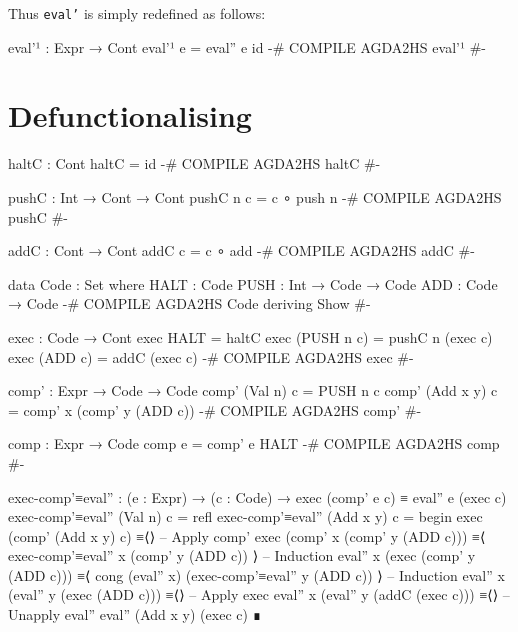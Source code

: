 \documentclass{article}
\begin{document}
\noindent
Thus \texttt{eval'} is simply redefined as follows:

\begin{code}
eval'¹ : Expr → Cont
eval'¹ e = eval'' e id
{-# COMPILE AGDA2HS eval'¹ #-}
\end{code}

\section{Defunctionalising}

\begin{code}
haltC : Cont
haltC = id
{-# COMPILE AGDA2HS haltC #-}

pushC : Int → Cont → Cont
pushC n c = c ∘ push n
{-# COMPILE AGDA2HS pushC #-}

addC : Cont → Cont
addC c = c ∘ add
{-# COMPILE AGDA2HS addC #-}

data Code : Set where
  HALT : Code
  PUSH : Int → Code → Code
  ADD : Code → Code
{-# COMPILE AGDA2HS Code deriving Show #-}

exec : Code → Cont
exec HALT = haltC
exec (PUSH n c) = pushC n (exec c)
exec (ADD c) = addC (exec c)
{-# COMPILE AGDA2HS exec #-}

comp' : Expr → Code → Code
comp' (Val n) c = PUSH n c
comp' (Add x y) c = comp' x (comp' y (ADD c))
{-# COMPILE AGDA2HS comp' #-}

comp : Expr → Code
comp e = comp' e HALT
{-# COMPILE AGDA2HS comp #-}
\end{code}
\begin{code}
exec-comp'≡eval'' : (e : Expr) → (c : Code)
  → exec (comp' e c) ≡ eval'' e (exec c)
exec-comp'≡eval'' (Val n) c = refl
exec-comp'≡eval'' (Add x y) c =
  begin
    exec (comp' (Add x y) c)
  ≡⟨⟩ -- Apply comp'
    exec (comp' x (comp' y (ADD c)))
  ≡⟨ exec-comp'≡eval'' x (comp' y (ADD c)) ⟩ -- Induction
    eval'' x (exec (comp' y (ADD c)))
  ≡⟨ cong (eval'' x) (exec-comp'≡eval'' y (ADD c)) ⟩ -- Induction
    eval'' x (eval'' y (exec (ADD c)))
  ≡⟨⟩ -- Apply exec
    eval'' x (eval'' y (addC (exec c)))
  ≡⟨⟩ -- Unapply eval''
    eval'' (Add x y) (exec c)
  ∎
\end{code}
\end{document}
